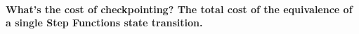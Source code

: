 \paragraph{What's the cost of checkpointing? The total cost of the equivalence
of a single Step Functions state transition.}



















